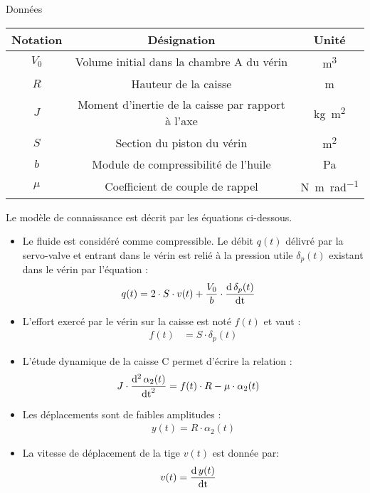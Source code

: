 \begin{Exo}[name={Devoir},title={Système de pendulation},origin={Adapté de Centrale MP 2000},label={exo:CentralePendulation}]
Données

 \begin{tabular}{|c|c|c|}\hline
Notation	& 	Désignation					&	Unité \\ \hline
$V_0$	&	Volume initial dans la chambre A du vérin & \si{\metre^3} \\

$R$		& Hauteur de la caisse						& \si{\metre} \\

$J$			&	Moment d'inertie de la caisse par rapport à l'axe & \si{\kilogram\metre\tothe{2}}\\
 
$S$		& Section du piston du vérin					& \si{\metre^2}\\
 
$b$     	& Module de compressibilité de l'huile		& \si{\pascal} \\
 
$\mu$		& Coefficient de couple de rappel	 &  \si{\newton\metre\per\radian} \\ \hline
\end{tabular}
	 
 
 Le modèle de connaissance est décrit par les équations ci-dessous.
 \begin{itemize}
\item  Le fluide est considéré comme compressible. Le débit $q(t)$  délivré par la servo-valve et entrant dans le vérin est relié à la pression utile $\delta_p(t)$   existant dans le vérin par l'équation :
 \begin{align*}
q(t)&=2\cdot S\cdot v(t)+\dfrac{V_0}{b}\cdot \dfrac{\mathrm{d}\,\delta_p(t)}{\mathrm{dt}}
\end{align*}
\item L'effort exercé par le vérin sur la caisse est noté  $f(t)$   et vaut :  
\begin{align*}
f(t)&= S\cdot \delta_p(t)
\end{align*}
\item 	L'étude  dynamique de la caisse C permet d'écrire la relation :
\begin{align*}
J\cdot \dfrac{\mathrm{d}^{2}\,\alpha_2(t)}{\mathrm{dt}^{2}}&=f(t)\cdot R-\mu \cdot \alpha_2(t)
\end{align*}
\item Les déplacements sont de faibles amplitudes :  	
\begin{align*}
y(t) =R\cdot \alpha_2(t)
\end{align*}
\item 	La vitesse de déplacement de la tige $v(t)$   est donnée par:
\begin{align*}
v(t)&=\dfrac{\mathrm{d}\,y(t)}{\mathrm{dt}}
\end{align*}


\end{itemize}
\end{Exo}
